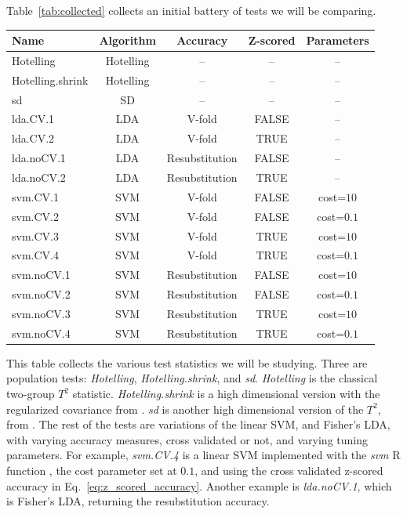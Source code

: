\documentclass[12pt,a4paper]{article}
\theoremstyle{definition}
\newcommand{\R}{\textsf{R }}
\begin{document}
\bigskip

Table~\ref{tab:collected} collects an initial battery of tests we will be comparing. 
\begin{tcolorbox}
\centering
\begin{tabular}{l|c|c|c|c}
Name & Algorithm & Accuracy & Z-scored & Parameters\\ 
\hline
\hline
Hotelling & Hotelling & -- & -- & -- \\ 
Hotelling.shrink & Hotelling & -- & -- & -- \\ 
sd & SD & -- & -- & -- \\ 
lda.CV.1 	& LDA & V-fold 			& FALSE 	&  -- \\ 
lda.CV.2 	& LDA & V-fold 			& TRUE 	& -- \\ 
lda.noCV.1 	& LDA & Resubstitution 	& FALSE 	&  --\\ 
lda.noCV.2 	& LDA & Resubstitution 	& TRUE 	&  --\\ 
svm.CV.1 	& SVM & V-fold 			& FALSE & cost=$10$ \\ 
svm.CV.2 	& SVM & V-fold 			& FALSE & cost=$0.1$ \\ 
svm.CV.3 	& SVM & V-fold 			& TRUE 	& cost=$10$ \\ 
svm.CV.4 	& SVM & V-fold 			& TRUE 	& cost=$0.1$ \\ 
svm.noCV.1 	& SVM & Resubstitution 	& FALSE & cost=$10$ \\ 
svm.noCV.2 	& SVM & Resubstitution 	& FALSE & cost=$0.1$ \\ 
svm.noCV.3 	& SVM & Resubstitution 	& TRUE 	& cost=$10$ \\ 
svm.noCV.4 	& SVM & Resubstitution 	& TRUE 	& cost=$0.1$ \\
\end{tabular} 
\captionsetup{type=table}
\caption{\footnotesize
This table collects the various test statistics we will be studying. 
Three are population tests: \emph{Hotelling}, \emph{Hotelling.shrink}, and \emph{sd}.
\textit{Hotelling} is the classical two-group $T^2$ statistic. 
\textit{Hotelling.shrink} is a high dimensional version with the regularized covariance from \citet{schafer_shrinkage_2005}. 
\textit{sd} is another high dimensional version of the $T^2$, from \citet{srivastava_two_2013}. 
The rest of the tests are variations of the linear SVM, and Fisher's LDA, with varying accuracy measures, cross validated or not, and varying tuning parameters. 
For example, \textit{svm.CV.4} is a linear SVM implemented with the \emph{svm} \R function \citep{meyer_e1071:_2015},
the cost parameter set at $0.1$, and using the cross validated z-scored accuracy in Eq.~\ref{eq:z_scored_accuracy}.
Another example is \textit{lda.noCV.1}, which is Fisher's LDA, returning the resubstitution accuracy.}
\label{tab:collected}
\end{tcolorbox}
\end{document}
